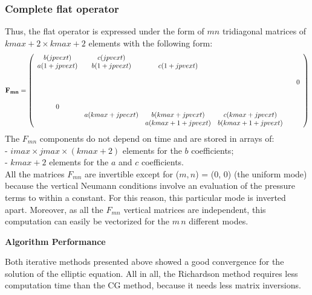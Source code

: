 \subsubsection{Complete flat operator}
Thus, the flat operator is expressed under the form of $m n$ tridiagonal
matrices of $kmax+2 \times kmax+2$ elements with the following form:
\begin{displaymath}
{\bf F_{mn}}=
\left(
\begin{array}{cccccc}
b(jpvext) & c(jpvext)         &   &   &   &   \\
a(1+jpvext) & b(1+jpvext) & c(1+jpvext)          &   &   &   \\
     &      &                &   &   &   \\
     &      &             &   &   & \huge{0}  \\
     &      &                 &   &   &   \\
     &      &                 &   &   &   \\
\huge{0}     &      &               &   &   &   \\
     &  a(kmax+jpvext)    &  b(kmax+jpvext)         &  c(kmax+jpvext)&   &   \\
     &      &                      a(kmax+1+jpvext) &  b(kmax+1+jpvext) & &\\
\end{array}
\right)
\end{displaymath}
The $ F_{mn}$ components do not depend on time and are
stored in arrays of:\\
- $imax \times jmax \times (kmax+2)$ elements for the $b$ coefficients;\\
- $kmax+2$ elements for the $a$ and $c$ coefficients.\\
All the matrices $F_{mn}$ are invertible except for
($m, n$) = (0, 0) (the uniform mode) because the vertical Neumann conditions
involve an evaluation of the pressure terms to within a constant.
For this reason, this particular mode is inverted apart. Moreover, as all the
$F_{mn}$ vertical matrices are independent,
this computation can easily be vectorized for the $m \, n$ different modes.

{\bf Algorithm Performance}

Both iterative methods presented above showed a good convergence for the
solution of the elliptic equation. All in all, the Richardson method
requires less computation time than the CG method, because it needs less
matrix inversions.

